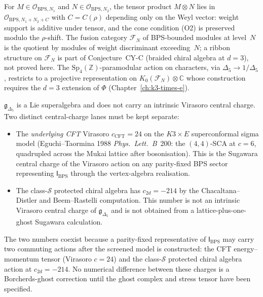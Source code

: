 \begin{remark}
\label{rem:k3ca-obps-fusion-scope}
For $M\in\mathcal{O}_{\mathrm{BPS},N_1}$ and
$N\in\mathcal{O}_{\mathrm{BPS},N_2}$, the tensor product
$M\otimes N$ lies in $\mathcal{O}_{\mathrm{BPS},N_1+N_2+C}$ with
$C = C(\rho)$ depending only on the Weyl vector: weight support is
additive under tensor, and the cone condition (O2) is preserved
modulo the $\rho$-shift. The fusion category $\mathcal F_N$ of
BPS-bounded modules at level~$N$ is the quotient by modules of
weight discriminant exceeding~$N$; a ribbon structure on
$\mathcal F_N$ is part of Conjecture~CY-C (braided chiral algebra
at $d=3$), not proved here. The
$\mathrm{Sp}_4(\mathbb Z)$-paramodular action on characters, via
$\Delta_5\to 1/\Delta_5$, restricts to a projective representation
on $K_0(\mathcal F_N)\otimes\mathbb C$ whose construction requires
the $d=3$ extension of $\Phi$
(Chapter~\ref{ch:k3-times-e}).
\end{remark}

\begin{remark}[Central charges: Virasoro \texorpdfstring{$c=24$}{c=24} versus chiral-Hochschild \texorpdfstring{$c_{\Delta_5}=-214$}{c-Delta-5=-214}]
\label{rem:k3ca-obps-central-charge}
$\mathfrak g_{\Delta_5}$ is a Lie superalgebra and does not carry
an intrinsic Virasoro central charge. Two distinct central-charge
lanes must be kept separate:
\begin{itemize}
\item The \emph{underlying CFT} Virasoro $c_{\mathrm{CFT}} = 24$
 on the $K3\times E$ superconformal sigma model
 (Eguchi--Taormina 1988 \emph{Phys.\ Lett.\ B}~200: the
 $(4,4)$-SCA at $c=6$, quadrupled across the Mukai lattice after
 bosonisation). This is the Sugawara central charge of the Virasoro
 action on any parity-fixed BPS sector representing
 $\mathsf I_{\mathrm{BPS}}$ through the vertex-algebra realisation.
\item The class-\(\mathcal S\) protected chiral algebra has
 \(c_{2d}=-214\) by the Chacaltana--Distler and Beem--Rastelli
 computation. This number is not an intrinsic Virasoro central charge
 of \(\mathfrak g_{\Delta_5}\) and is not obtained from a
 lattice-plus-one-ghost Sugawara calculation.
\end{itemize}
The two numbers coexist because a parity-fixed representative of
\(\mathsf I_{\mathrm{BPS}}\) may carry two commuting actions after the
screened model is constructed: the CFT energy--momentum tensor
(Virasoro \(c=24\)) and the class-\(\mathcal S\) protected chiral
algebra action at \(c_{2d}=-214\). No numerical difference between
these charges is a Borcherds-ghost correction until the ghost complex
and stress tensor have been specified.
\end{remark}


